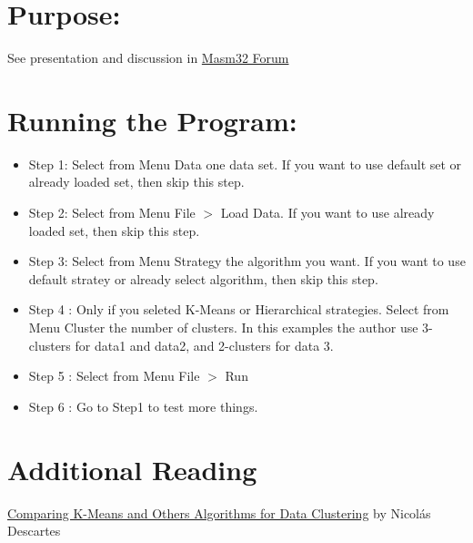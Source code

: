 \documentclass[12pt,a4paper]{scrartcl}
\begin{document}
\title{\color{myblue}{Comparing K-Means and Other Algorithms for Data Clustering\break in Assembly. }}

\author{Héctor S. Enrique}
\date{ january 30, 2024}
\maketitle

\section{Purpose:}

	See presentation and discussion in \href{https://masm32.com/board/index.php?topic=11649.0}{ Masm32 Forum} 

\section{Running the Program: }

    \begin{itemize}
        \item Step 1: Select from Menu Data one data set. If you want to use default set or already loaded set, then skip this step. 
        \item Step 2: Select from Menu File  $\displaystyle >$
 Load Data. If you want to use already loaded set, then skip this step. 
        \item Step 3:  Select from Menu Strategy the algorithm you want. If you want to use default stratey or already select algorithm, then skip this step. 
        \item Step 4 : Only if you seleted K-Means or Hierarchical strategies. Select from  Menu Cluster the number of clusters. In this examples the author use 3-clusters for data1 and data2, and  2-clusters for data 3. 
        \item Step 5 : Select from Menu File $\displaystyle >$ Run 
        \item Step 6 : Go to Step1 to test more things. 
     \end{itemize}

\section{Additional Reading}

	\href{https://www.codeproject.com/Articles/5375470/Comparing-K-Means-and-Others-Algorithms-for-Data-C}{Comparing K-Means and Others Algorithms for Data Clustering} by Nicolás Descartes 

\thispagestyle{empty}
\end{document}
